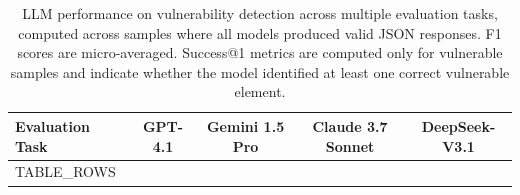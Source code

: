 \begin{table}[htbp]
\centering
\caption{LLM performance on vulnerability detection across multiple evaluation tasks, computed across samples where all models produced valid JSON responses. F1 scores are micro-averaged. Success@1 metrics are computed only for vulnerable samples and indicate whether the model identified at least one correct vulnerable element.}
\label{tab:vanilla_performance}
\begin{tabular}{lcccc}
\toprule
\textbf{Evaluation Task} & \textbf{GPT-4.1} & \textbf{Gemini 1.5 Pro} & \textbf{Claude 3.7 Sonnet} & \textbf{DeepSeek-V3.1} \\
\midrule
{TABLE_ROWS}
\bottomrule
\end{tabular}
\end{table}